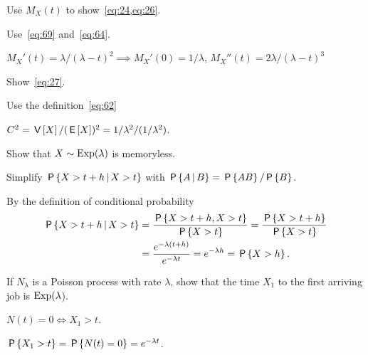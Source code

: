 \begin{exercise}\label{ex:21}
Use $M_X(t)$ to show~\cref{eq:24,eq:26}.
\begin{hint}
Use~\cref{eq:69} and~\cref{eq:64}.
\end{hint}
\begin{solution} 
 $ M_X'(t)=\lambda/(\lambda-t)^2 \implies M_X'(0)=1/\lambda$, $M_X''(t)=2\lambda/(\lambda-t)^3$ %
\end{solution}
\end{exercise}


\begin{exercise}\label{ex:29}
Show~\cref{eq:27}.
\begin{hint}
 Use the definition~\cref{eq:62} 
\end{hint}
\begin{solution}
 $C^2= \V X/(\E X)^2 = 1/\lambda^2/(1/\lambda^2)$.
\end{solution}
\end{exercise}

\begin{exercise}\label{ex:l-214}
 Show that $X\sim \Exp(\lambda)$ is memoryless.
\begin{hint}
Simplify $\P{X>t+h\given X>t}$ with $\P{A\given B} = \P{AB}/\P{B}$. 
\end{hint}
\begin{solution}
By the definition of conditional probability
\begin{equation*}
  \begin{split}
 \P{X>t+h\given X>t} &= \frac{\P{X>t+h, X>t}}{\P{X>t}} = \frac{\P{X>t+h}}{\P{X>t}} \\
&= \frac{e^{-\lambda(t+h)}}{e^{-\lambda t}} = e^{-\lambda h} = \P{X>h}.
  \end{split}
\end{equation*}
\end{solution}
\end{exercise}

\begin{exercise}\label{ex:l-212}
 If  $N_\lambda$ is a Poisson process with rate $\lambda$, show that the time $X_1$ to the first arriving job is $\Exp(\lambda$).
\begin{hint}
$N(t)= 0 \iff X_1 > t$. 
\end{hint}
\begin{solution}
$\P{X_1> t} = \P{N(t) = 0} = e^{-\lambda t}$.
\end{solution}
\end{exercise}

